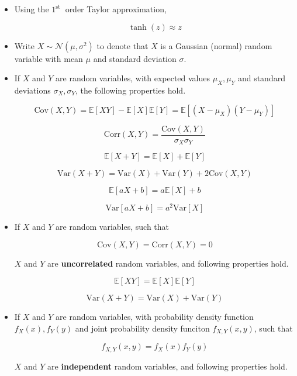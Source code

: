 \documentclass{report}
\begin{document}
\begin{concept}
    \begin{itemize}
        \item
        Using the $1^{\text {st }}$ order Taylor approximation,

        $$
        \tanh (z) \approx z
        $$
        \item Write $X \sim \mathcal{N}\left(\mu, \sigma^{2}\right)$ to denote that $X$ is a Gaussian (normal) random variable with mean $\mu$ and standard deviation $\sigma$.
        \item
        If $X$ and $Y$ are random variables, with expected values $\mu_X, \mu_Y$ and standard deviations $\sigma_X, \sigma_Y$, the following properties hold.

        $$
        \text{Cov}(X, Y) = \mathbb{E}[XY] - \mathbb{E}[X]\mathbb{E}[Y] = \mathbb{E}[(X-\mu_X)(Y-\mu_Y)]
        $$

        $$
        \text{Corr}(X, Y) = \frac{\text{Cov}(X, Y)}{\sigma_X \sigma_Y}
        $$

        $$
        \mathbb{E}[X+Y] = \mathbb{E}[X] + \mathbb{E}[Y]
        $$

        $$
        \text{Var}(X+Y) = \text{Var}(X) + \text{Var}(Y) + 2\text{Cov}(X, Y)
        $$

        $$
        \mathbb{E}[aX+b] = a\mathbb{E}[X] + b
        $$

        $$
        \text{Var}[aX+b] = a^2 \text{Var}[X]
        $$
        \item
        If $X$ and $Y$ are random variables, such that

        $$
        \text{Cov}(X, Y)=\text{Corr}(X, Y)=0
        $$

        $X$ and $Y$ are \textbf{uncorrelated} random variables, and following properties hold.

        $$
        \mathbb{E}[XY] = \mathbb{E}[X] \mathbb{E}[Y]
        $$

        $$
        \text{Var}(X+Y) = \text{Var}(X) + \text{Var}(Y)
        $$
        \item
        If $X$ and $Y$ are random variables, with probability density function $f_X(x), f_Y(y)$ and joint probability density funciton $f_{X, Y}(x, y)$, such that

        $$
        f_{X, Y}(x, y) = f_X(x)f_Y(y)
        $$

        $X$ and $Y$ are \textbf{independent} random variables, and following properties hold.


\end{itemize}
\end{concept}
\end{document}
